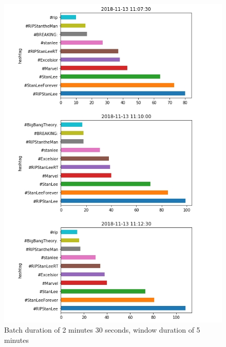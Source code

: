 \documentclass[12pt,a4paper]{article}
\begin{document}
\begin{figure}[h]
    \centering
    \includegraphics[width=12cm]{output3-5min.jpg}
    \caption{Batch duration of 2 minutes 30 seconds, window duration of 5 minutes}
    \label{fig:my_label}
\end{figure}
\end{document}
